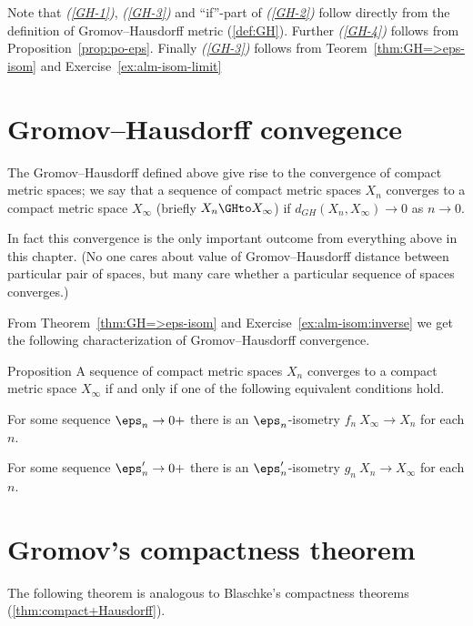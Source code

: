 Note that {\it (\ref{GH-1})}, {\it(\ref{GH-3})} and ``if''-part of {\it(\ref{GH-2})} follow directly from the definition of Gromov--Hausdorff metric (\ref{def:GH}).
Further {\it(\ref{GH-4})} follows from Proposition~\ref{prop:po-eps}.
Finally {\it (\ref{GH-3})} follows from Teorem~\ref{thm:GH=>eps-isom} and Exercise~\ref{ex:alm-isom-limit}
\qeds




\section{Gromov--Hausdorff convegence}

The Gromov--Hausdorff defined above give rise to the convergence of compact metric spaces;
we say that a sequence of compact metric spaces $X_n$ converges to a compact metric space $X_\infty$ 
(briefly $X_n\GHto X_\infty$)
if
$d_{GH}(X_n,X_\infty)\to0$ as $n\to 0$.

In fact this convergence is the only important  outcome from everything above in this chapter.
(No one cares about value of Gromov--Hausdorff distance between particular pair of spaces,
but many care whether a particular sequence of spaces converges.)

From Theorem~\ref{thm:GH=>eps-isom} and Exercise~\ref{ex:alm-isom:inverse} we get the following characterization of Gromov--Hausdorff convergence.

\begin{thm}{Proposition}
A sequence of compact metric spaces $X_n$ converges to a compact metric space $X_\infty$ 
if and only if one of the following equivalent conditions hold.
\begin{subthm}
For some sequence $\eps_n\to 0+$ 
there is an $\eps_n$-isometry $f_n\:X_\infty\to X_n$ for each $n$.
\end{subthm}

\begin{subthm}
For some sequence $\eps_n'\to 0+$ 
there is an $\eps_n'$-isometry $g_n\:X_n\to X_\infty$ for each $n$.
\end{subthm}
\end{thm}




\section{Gromov's compactness theorem}

The following theorem is analogous to Blaschke's compactness theorems (\ref{thm:compact+Hausdorff}).

